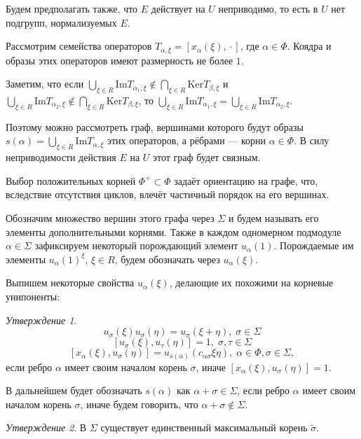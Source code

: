 \documentclass[15pt]{article}
\theoremstyle{remark}
\newtheorem{prop}{Утверждение}
\begin{document}
Будем предполагать также, что $E$ действует на $U$ неприводимо, то есть в $U$ нет подгрупп, нормализуемых $E$.

Рассмотрим семейства операторов $T_{\alpha,\xi} = [x_\alpha(\xi),\,\boldsymbol{\cdot}\,]$, где $\alpha \in \Phi$. Коядра и образы этих операторов имеют размерность не более $1$.

Заметим, что если $\bigcup_{\xi\in R}\mathrm{Im}T_{\alpha_1,\xi} \notin \bigcap_{\xi\in R}\mathrm{Ker}T_{\beta,\xi}$ и $\bigcup_{\xi\in R}\mathrm{Im}T_{\alpha_2,\xi} \notin \bigcap_{\xi\in R}\mathrm{Ker}T_{\beta,\xi}$, то $\bigcup_{\xi\in R}\mathrm{Im}T_{\alpha_1,\xi} = \bigcup_{\xi\in R}\mathrm{Im}T_{\alpha_2,\xi}$.

Поэтому можно рассмотреть граф, вершинами которого будут образы $s(\alpha) = \bigcup_{\xi\in R}\mathrm{Im}T_{\alpha,\xi}$ этих операторов, а рёбрами --- корни $\alpha \in \Phi$. В силу неприводимости действия $E$ на $U$ этот граф будет связным.

Выбор положительных корней $\Phi^+ \subset \Phi$ задаёт ориентацию на графе, что, вследствие отсутствия циклов, влечёт частичный порядок на его вершинах.

Обозначим множество вершин этого графа через $\Sigma$ и будем называть его элементы дополнительными корнями. Также в каждом одномерном подмодуле $\alpha \in \Sigma$ зафиксируем некоторый порождающий элемент $u_\alpha(1)$. Порождаемые им элементы $u_\alpha(1)^\xi$, $\xi \in R$, будем обозначать через $u_\alpha(\xi)$.

Выпишем некоторые свойства $u_\alpha(\xi)$, делающие их похожими на корневые унипоненты:

\begin{prop}
  $$ u_\sigma(\xi) u_\sigma(\eta) = u_\sigma(\xi + \eta), \; \sigma \in \Sigma $$
  $$ [u_\sigma(\xi), u_\tau(\eta)] = 1, \; \sigma,\tau \in \Sigma $$
  $$ [x_\alpha(\xi), u_\sigma(\eta)] = u_{s(\alpha)}(c_{\alpha\sigma}\xi\eta), \; \alpha \in \Phi, \sigma \in \Sigma,$$ если ребро $\alpha$ имеет своим началом корень $\sigma$, иначе $ [x_\alpha(\xi), u_\sigma(\eta)]=1 $.
\end{prop}

В дальнейшем будет обозначать $s(\alpha)$ как $\alpha+\sigma \in \Sigma$, если ребро $\alpha$ имеет своим началом корень $\sigma$, иначе будем говорить, что  $\alpha+\sigma \notin \Sigma$.

\begin{prop}
  В $\Sigma$ существует единственный максимальный корень $\widetilde{\sigma}$.
\end{prop}
\end{document}
